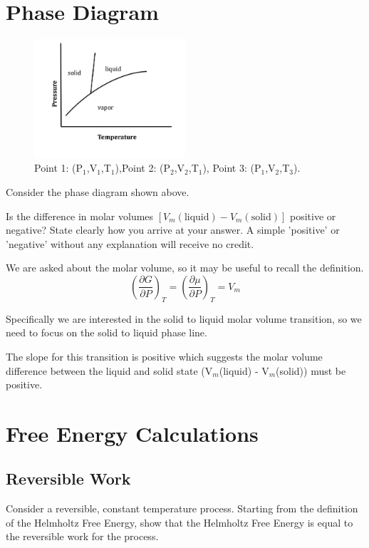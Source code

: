 \documentclass{article}
\newcommand{\be}{\begin{equation}}
\newcommand{\ee}{\end{equation}}
\newcommand{\pd}{\partial}
\begin{document}
\section{Phase Diagram}
\begin{figure}[h]
\centering
\caption{Point 1: (P$_1$,V$_1$,T$_1$),\quad Point 2: (P$_2$,V$_2$,T$_1$), \quad Point 3: (P$_1$,V$_2$,T$_3$).}
\includegraphics[width=0.5\textwidth]{midterm2.png}
\end{figure}

Consider the phase diagram shown above. 

\bigskip

Is the difference in molar volumes $\left[V_m(\text{liquid}) - V_m(\text{solid})  \right]$ positive or negative? 
State clearly how you arrive at your answer. 
A simple 'positive' or 'negative' without any explanation will receive no credit. 

\bigskip

We are asked about the molar volume, so it may be useful to recall the definition. 
\be
\left(\frac{\pd G}{\pd P}\right)_T = \left(\frac{\pd \mu}{\pd P}\right)_T  = V_m
\ee

Specifically we are interested in the solid to liquid molar volume transition, so we need to focus on the solid to liquid phase line. 

The slope for this transition is positive which suggests the molar volume difference between the liquid and solid state (V$_m$(liquid) - V$_m$(solid)) must be positive. 

\newpage



\section{Free Energy Calculations}

\subsection*{Reversible Work}
Consider a reversible, constant temperature process. 
Starting from the definition of the Helmholtz Free Energy, show that the Helmholtz Free Energy is equal to the reversible work for the process. 
\end{document}
